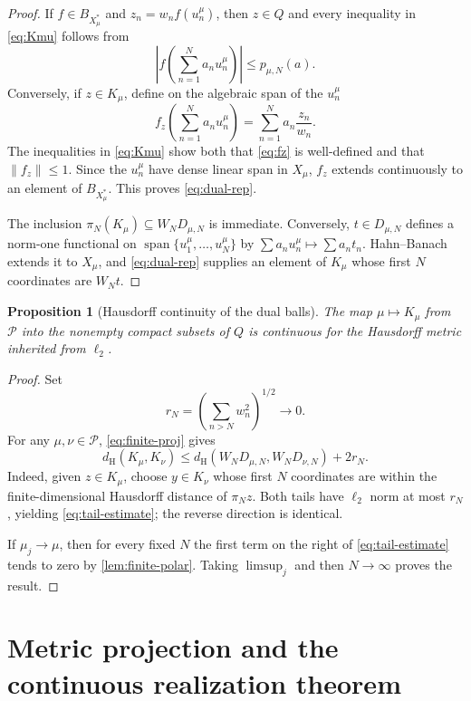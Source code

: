 \documentclass[11pt]{article}
\newtheorem{proposition}[theorem]{Proposition}
\theoremstyle{definition}
\newcommand{\Pcal}{\mathcal P}
\newcommand{\ellTwo}{\ell_2}
\newcommand{\Span}{\operatorname{span}}
\newcommand{\Ball}{B}
\newcommand{\Haus}{d_{\mathrm H}}
\begin{document}
\begin{proof}
If $f\in\Ball_{X_\mu^*}$ and $z_n=w_nf(u_n^\mu)$, then $z\in Q$ and every
inequality in \eqref{eq:Kmu} follows from
\[
 \left|f\left(\sum_{n=1}^N a_nu_n^\mu\right)\right|
 \leq p_{\mu,N}(a).
\]
Conversely, if $z\in K_\mu$, define on the algebraic span of the $u_n^\mu$
\[
 f_z\left(\sum_{n=1}^N a_nu_n^\mu\right)
 =\sum_{n=1}^N a_n\frac{z_n}{w_n}.
 \tag{4.11}\label{eq:fz}
\]
The inequalities in \eqref{eq:Kmu} show both that \eqref{eq:fz} is well-defined
and that $\|f_z\|\leq1$.  Since the $u_n^\mu$ have dense linear span in
$X_\mu$, $f_z$ extends continuously to an element of $\Ball_{X_\mu^*}$.
This proves \eqref{eq:dual-rep}.

The inclusion $\pi_N(K_\mu)\subseteq W_ND_{\mu,N}$ is immediate.  Conversely,
$t\in D_{\mu,N}$ defines a norm-one functional on
$\Span\{u_1^\mu,\ldots,u_N^\mu\}$ by
$\sum a_nu_n^\mu\mapsto\sum a_nt_n$.  Hahn--Banach extends it to
$X_\mu$, and \eqref{eq:dual-rep} supplies an element of $K_\mu$ whose first
$N$ coordinates are $W_Nt$.
\end{proof}

\begin{proposition}[Hausdorff continuity of the dual balls]
\label{prop:hausdorff}
The map $\mu\mapsto K_\mu$ from $\Pcal$ into the nonempty compact subsets of
$Q$ is continuous for the Hausdorff metric inherited from $\ellTwo$.
\end{proposition}

\begin{proof}
Set
\[
 r_N=\left(\sum_{n>N}w_n^2\right)^{1/2}\longrightarrow0.
\]
For any $\mu,\nu\in\Pcal$, \eqref{eq:finite-proj} gives
\[
 \Haus(K_\mu,K_\nu)
 \leq \Haus(W_ND_{\mu,N},W_ND_{\nu,N})+2r_N.
 \tag{4.12}\label{eq:tail-estimate}
\]
Indeed, given $z\in K_\mu$, choose $y\in K_\nu$ whose first $N$ coordinates
are within the finite-dimensional Hausdorff distance of $\pi_Nz$.  Both tails
have $\ellTwo$ norm at most $r_N$, yielding \eqref{eq:tail-estimate}; the reverse
direction is identical.

If $\mu_j\to\mu$, then for every fixed $N$ the first term on the right of
\eqref{eq:tail-estimate} tends to zero by \cref{lem:finite-polar}.  Taking
$\limsup_j$ and then $N\to\infty$ proves the result.
\end{proof}

\section{Metric projection and the continuous realization theorem}
\end{document}
